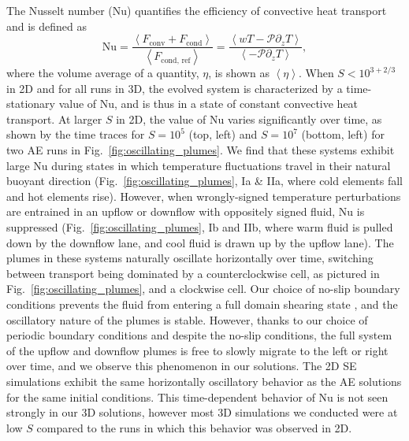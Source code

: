 \documentclass[aps, pre, onecolumn, nofootinbib, notitlepage, groupedaddress, amsfonts, amssymb, amsmath, longbibliography]{revtex4-1}
\newcommand{\angles}[1]{\ensuremath{\left\langle #1 \right\rangle}}
\begin{document}
The Nusselt number (Nu) quantifies the efficiency of convective heat transport
and is defined as
\begin{equation}
\text{Nu} = \frac{\angles{F_{\text{conv}} + F_{\text{cond}}}}{\angles{F_{\text{cond, ref}}}}
 = \frac{\angles{wT - \mathcal{P}\partial_z T}}{\angles{- \mathcal{P} \partial_z T}},
\end{equation}
where the volume average of a quantity, $\eta$, is shown as $\angles{\eta}$.
When $S < 10^{3+2/3}$ in 2D and for all runs in 3D, 
the evolved system is characterized by a time-stationary value of Nu, and is thus
in a state of constant convective heat transport.
At larger $S$ in 2D, the value of Nu varies significantly over time,
as shown by the time traces for $S = 10^5$ (top, left) and $S = 10^7$ (bottom, left) for two
AE runs in Fig.~\ref{fig:oscillating_plumes}. We find that these systems exhibit
large Nu during
states in which temperature fluctuations travel in their natural buoyant
direction (Fig.~\ref{fig:oscillating_plumes}, Ia \& IIa, where cold elements fall and hot elements rise).
However, when wrongly-signed temperature perturbations are entrained in an upflow or downflow
with oppositely signed fluid, Nu is suppressed (Fig.~\ref{fig:oscillating_plumes}, Ib and IIb, 
where warm fluid is pulled down by the downflow
lane, and cool fluid is drawn up by the upflow lane). The plumes in these
systems naturally oscillate horizontally over time, switching between transport being dominated
by a counterclockwise cell, as pictured in Fig.~\ref{fig:oscillating_plumes}, and
a clockwise cell. Our choice of no-slip
boundary conditions prevents the fluid from entering a full domain shearing state 
\cite{goluskin&all2014}, and the
oscillatory nature of the plumes is stable. However, thanks to our choice of periodic
boundary conditions and despite the no-slip conditions, the full system of the
upflow and downflow plumes is free to slowly migrate to the left or right over time,
and we observe this phenomenon in our solutions.
The 2D SE simulations exhibit the same horizontally
oscillatory behavior as the AE solutions for the same initial conditions. 
This time-dependent behavior of Nu is not seen strongly in our 3D solutions,
however most 3D simulations we conducted were at low $S$ compared to the runs in
which this behavior was observed in 2D.
\end{document}

